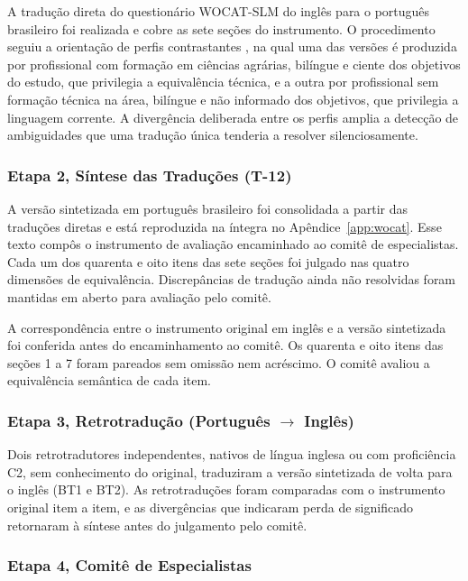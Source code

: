 \documentclass[preprint,authoryear,12pt]{elsarticle}
\begin{document}
A tradução direta do questionário WOCAT-SLM do inglês para o português brasileiro foi realizada e cobre as sete seções do instrumento. O procedimento seguiu a orientação de perfis contrastantes \citep{Beaton2000}, na qual uma das versões é produzida por profissional com formação em ciências agrárias, bilíngue e ciente dos objetivos do estudo, que privilegia a equivalência técnica, e a outra por profissional sem formação técnica na área, bilíngue e não informado dos objetivos, que privilegia a linguagem corrente. A divergência deliberada entre os perfis amplia a detecção de ambiguidades que uma tradução única tenderia a resolver silenciosamente.

\subsubsection{Etapa 2, Síntese das Traduções (T-12)}

A versão sintetizada em português brasileiro foi consolidada a partir das traduções diretas e está reproduzida na íntegra no Apêndice~\ref{app:wocat}. Esse texto compôs o instrumento de avaliação encaminhado ao comitê de especialistas. Cada um dos quarenta e oito itens das sete seções foi julgado nas quatro dimensões de equivalência. Discrepâncias de tradução ainda não resolvidas foram mantidas em aberto para avaliação pelo comitê.

A correspondência entre o instrumento original em inglês \citep{Liniger2019} e a versão sintetizada foi conferida antes do encaminhamento ao comitê. Os quarenta e oito itens das seções 1 a 7 foram pareados sem omissão nem acréscimo. O comitê avaliou a equivalência semântica de cada item.

\subsubsection{Etapa 3, Retrotradução (Português $\rightarrow$ Inglês)}

Dois retrotradutores independentes, nativos de língua inglesa ou com proficiência C2, sem conhecimento do original, traduziram a versão sintetizada de volta para o inglês (BT1 e BT2). As retrotraduções foram comparadas com o instrumento original item a item, e as divergências que indicaram perda de significado retornaram à síntese antes do julgamento pelo comitê.

\subsubsection{Etapa 4, Comitê de Especialistas}
\end{document}
